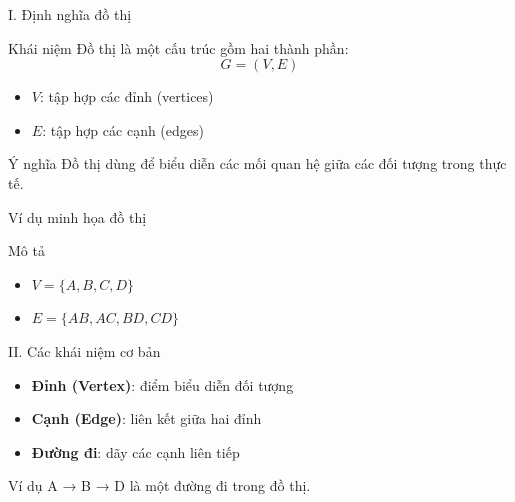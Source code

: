 \documentclass[aspectratio=169]{beamer}
\begin{document}
\begin{frame}{I. Định nghĩa đồ thị}
\begin{block}{Khái niệm}
Đồ thị là một cấu trúc gồm hai thành phần:
\[
G = (V, E)
\]
\end{block}

\begin{itemize}
    \item $V$: tập hợp các đỉnh (vertices)
    \item $E$: tập hợp các cạnh (edges)
\end{itemize}

\pause

\begin{block}{Ý nghĩa}
Đồ thị dùng để biểu diễn các mối quan hệ giữa các đối tượng trong thực tế.
\end{block}
\end{frame}

\begin{frame}{Ví dụ minh họa đồ thị}
\begin{center}
\end{center}

\begin{block}{Mô tả}
\begin{itemize}
    \item $V = \{A, B, C, D\}$
    \item $E = \{AB, AC, BD, CD\}$
\end{itemize}
\end{block}
\end{frame}

\begin{frame}{II. Các khái niệm cơ bản}
\begin{itemize}
    \item \textbf{Đỉnh (Vertex)}: điểm biểu diễn đối tượng
    \item \textbf{Cạnh (Edge)}: liên kết giữa hai đỉnh
    \item \textbf{Đường đi}: dãy các cạnh liên tiếp
\end{itemize}

\pause

\begin{block}{Ví dụ}
A → B → D là một đường đi trong đồ thị.
\end{block}
\end{frame}
\end{document}
